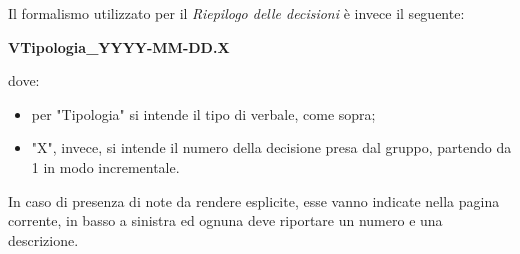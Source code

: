 	Il formalismo utilizzato per il \textit{Riepilogo delle decisioni} è invece il seguente: 
	\begin{center}
	\textbf{VTipologia\_YYYY-MM-DD.X}
	\end{center}
	dove:
	\begin{itemize}
		\item per "Tipologia" si intende il tipo di verbale, come sopra;
		\item "X", invece, si intende il numero della decisione presa dal gruppo, partendo da 1 in modo incrementale.
	\end{itemize}
	In caso di presenza di note da rendere esplicite, esse vanno indicate nella pagina corrente, in basso a sinistra ed ognuna deve riportare un numero e una descrizione.